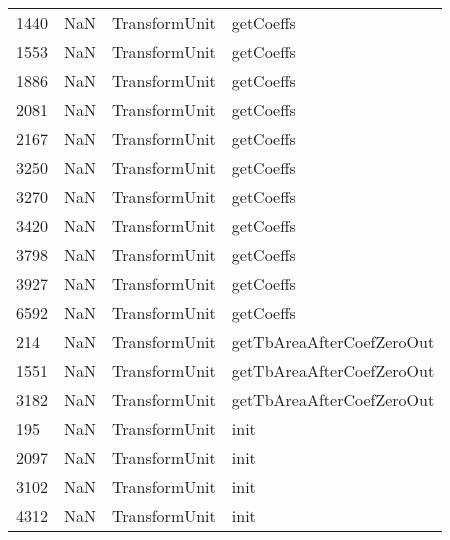\begin{tabular}{llll}
1440 &                   NaN &              TransformUnit &                                 getCoeffs \\
1553 &                   NaN &              TransformUnit &                                 getCoeffs \\
1886 &                   NaN &              TransformUnit &                                 getCoeffs \\
2081 &                   NaN &              TransformUnit &                                 getCoeffs \\
2167 &                   NaN &              TransformUnit &                                 getCoeffs \\
3250 &                   NaN &              TransformUnit &                                 getCoeffs \\
3270 &                   NaN &              TransformUnit &                                 getCoeffs \\
3420 &                   NaN &              TransformUnit &                                 getCoeffs \\
3798 &                   NaN &              TransformUnit &                                 getCoeffs \\
3927 &                   NaN &              TransformUnit &                                 getCoeffs \\
6592 &                   NaN &              TransformUnit &                                 getCoeffs \\
214  &                   NaN &              TransformUnit &                 getTbAreaAfterCoefZeroOut \\
1551 &                   NaN &              TransformUnit &                 getTbAreaAfterCoefZeroOut \\
3182 &                   NaN &              TransformUnit &                 getTbAreaAfterCoefZeroOut \\
195  &                   NaN &              TransformUnit &                                      init \\
2097 &                   NaN &              TransformUnit &                                      init \\
3102 &                   NaN &              TransformUnit &                                      init \\
4312 &                   NaN &              TransformUnit &                                      init \\

\end{tabular}
